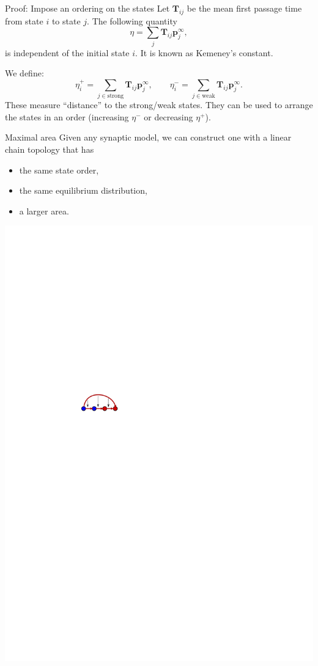 \documentclass[final,hyperref={pdfpagelabels=false,bookmarks=false}]{beamer}
\newcommand{\eq}{\mathbf{p}^\infty}
\newcommand{\fpt}{\mathbf{T}}
\begin{document}
\begin{frame}{}
\begin{columns}[t]
\begin{column}{0.29\linewidth}

\begin{block}{Proof: Impose an ordering on the states}
%
 Let $\fpt_{ij}$ be the mean first passage time from state $i$ to state $j$.
 The following quantity
 \begin{equation*}
   \eta = \sum_j \fpt_{ij} \eq_j,
 \end{equation*}
 is independent of the initial state $i$.
 It is known as Kemeney's constant. 

 \vp We define:
 \begin{equation*}
   \eta^+_i = \sum_{j\in\text{strong}} \fpt_{ij} \eq_j,
   \qquad
   \eta^-_i = \sum_{j\in\text{weak}} \fpt_{ij} \eq_j.
 \end{equation*}
 These measure ``distance'' to the strong/weak states.
 They can be used to arrange the states in an order (increasing $\eta^-$ or decreasing $\eta^+$).
%
\end{block}


\begin{block}{Maximal area}
%
 Given any synaptic model, we can construct one with a linear chain topology that has
 \parbox[c]{0.34\linewidth}{
  \begin{itemize}
    \item the same state order,
    \item the same equilibrium distribution,
    \item a larger area.
  \end{itemize}
 }
 \parbox[c]{0.34\linewidth}{
  \begin{center}
    \includegraphics[width=0.5\linewidth]{shortcut.svg}
  \end{center}
 }


\end{block}
\end{column}
\end{columns}
\end{frame}
\end{document}
